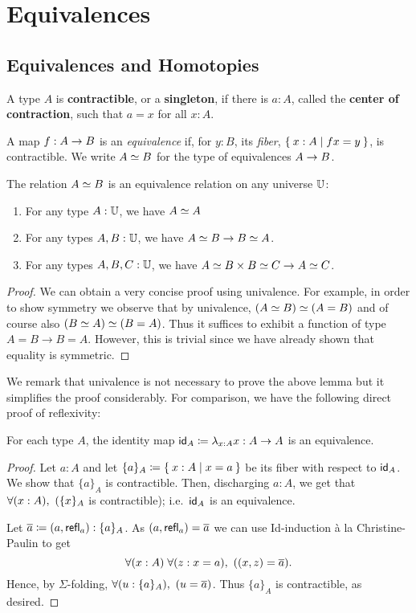 \chapter{Equivalences}
\label{cha:equivalences}

\section{Equivalences and Homotopies}

\begin{defn}\label{defn:contractible}
  A type $A$ is \textbf{contractible}, or a \textbf{singleton}, if there is $a:A$, called the \textbf{center of contraction}, such that $a=x$ for all $x:A$.
\end{defn}

\begin{defn}\label{defn:equivalence}
  A map $f:A\ra B$ is an {\em equivalence} if, for $y:B$, its {\em fiber}, $\setof{x:A | fx = y}$, is contractible.
  We write $\eqv A B$ for the type of equivalences $A\ra B$.
\end{defn}

\begin{lem}\label{lem:eq-rel}
The relation $\eqv A B$ is an equivalence relation on any universe $\bbU$:
\begin{enumerate}
\item For any type $A : \bbU$, we have $\eqv A A$
\item For any types $A, B : \bbU$, we have $\eqv A B \to \eqv B A$.
\item For any types $A, B, C : \bbU$, we have $\eqv A B \times \eqv B C \to \eqv A C$.
\end{enumerate}
\end{lem}
\begin{proof}
We can obtain a very concise proof using univalence. For example, in order to show symmetry we observe that by univalence, $\eqv {(\eqv A B)} {(A = B)}$ and of course also $\eqv {(\eqv B A)} {(B = A)}$. Thus it suffices to exhibit a function of type $A = B \to B = A$. However, this is trivial since we have already shown that equality is symmetric.
\end{proof}
We remark that univalence is not necessary to prove the above lemma but it simplifies the proof considerably. For comparison, we have the following direct proof of reflexivity:
\begin{lem}\label{lem:id-map}
For each type $A$, the identity map $\idfunc[A]\defeq \lambda_{x:A}x :A\ra A$ is an equivalence.
\end{lem}
\begin{proof}
  Let $a:A$ and let $\{a\}_A\defeq \setof{ x:A | x=a }$ be its fiber with respect to $\idfunc[A]$.
  We show that $\{ a\}_A$ is contractible.
  Then, discharging $a:A$, we get that $\fall{x:A} (\{ x\}_A$ is contractible); i.e.\ $\idfunc[A]$ is an equivalence.

  Let $\oa \defeq (a,\refl{a}):\{ a\}_A$.  As $(a,\refl{a}) = \oa$ we can use Id-induction \`{a} la Christine-Paulin to get
  \[\fall{x:A}{z:x=a} ((x,z)=\oa).\]
  Hence, by $\Sigma$-folding, $\fall{u:\{ a\}_A} (u=\oa)$.
  Thus $\{ a\}_A$ is contractible, as desired.
\end{proof}

